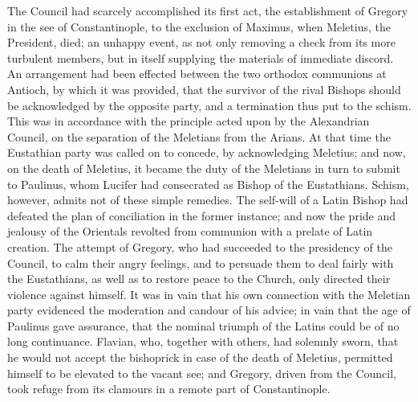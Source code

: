 The Council had scarcely accomplished its first act, the
establishment of Gregory in the see of Constantinople, to the
exclusion of Maximus, when Meletius, the President, died; an unhappy
event, as not only removing a check from its more turbulent members,
but in itself supplying the materials of immediate discord. An
arrangement had been effected between the two orthodox communions at
Antioch, by which it was provided, that the survivor of the rival
Bishops should be acknowledged by the opposite party, and a
termination thus put to the schism. This was in accordance with the
principle acted upon by the Alexandrian Council, on the separation of
the Meletians from the Arians. At that time the Eustathian party was
called on to concede, by acknowledging Meletius; and now, on the death
of Meletius, it became the duty of the Meletians in turn to submit to
Paulinus, whom Lucifer had consecrated as Bishop of the Eustathians.
Schism, however, admits not of these simple remedies. The
self-will of a Latin Bishop had defeated the plan of conciliation in
the former instance; and now the pride and jealousy of the Orientals
revolted from communion with a prelate of Latin creation. The attempt
of Gregory, who had succeeded to the presidency of the Council, to
calm their angry feelings, and to persuade them to deal fairly with
the Eustathians, as well as to restore peace to the Church, only
directed their violence against himself. It was in vain that his own
connection with the Meletian party evidenced the moderation and
candour of his advice; in vain that the age of Paulinus gave
assurance, that the nominal triumph of the Latins could be of no long
continuance. Flavian, who, together with others, had solemnly sworn,
that he would not accept the bishoprick in case of the death of
Meletius, permitted himself to be elevated to the vacant see; and
Gregory, driven from the Council, took refuge from its clamours in a
remote part of Constantinople.

